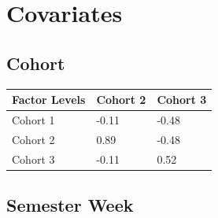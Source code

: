 \documentclass[
  letterpaper,
  DIV=11,
  numbers=noendperiod]{scrreprt}
\begin{document}
\section{Covariates}\label{covariates}

\subsection{Cohort}\label{cohort}

\begin{longtable}[]{@{}lll@{}}
\toprule\noalign{}
Factor Levels & Cohort 2 & Cohort 3 \\
\midrule\noalign{}
\endhead
\bottomrule\noalign{}
\endlastfoot
Cohort 1 & -0.11 & -0.48 \\
Cohort 2 & 0.89 & -0.48 \\
Cohort 3 & -0.11 & 0.52 \\
\end{longtable}

\subsection{Semester Week}\label{semester-week}
\end{document}
